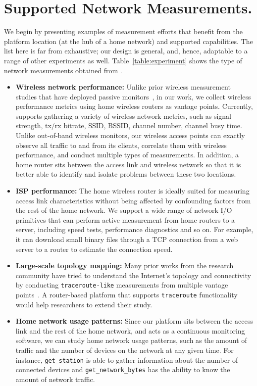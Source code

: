 {\section{Supported Network Measurements.}
\label{sec.network_measurement}
We begin by presenting examples of measurement efforts that benefit from the platform location (at the hub of a home network) and supported capabilities. The list here is far from exhaustive; our design is general, and, hence, adaptable to a range of other experiments as well. Table~\ref{table:experiment} shows the type of network measurements obtained from \sysname.

\begin{itemize}
\item \textbf{Wireless network performance:} Unlike prior wireless measurement studies that have deployed passive monitors~\cite{mahajan2006analyzing,raghavendra2009wi,papagiannaki2006experimental}, in our work, we collect wireless performance metrics using home wireless routers as vantage points. Currently, \sysname supports gathering a variety of wireless network metrics, such as signal strength, tx/rx bitrate, SSID, BSSID, channel number, channel busy time. Unlike out-of-band wireless monitors, our wireless access points can exactly observe all traffic to and from its clients, correlate them with wireless performance, and conduct multiple types of measurements. In addition, a home router sits between the access link and wireless network so that it is better able to identify and isolate problems between these two locations.

\item \textbf{ISP performance:} The home wireless router is ideally suited for measuring access link characteristics without being affected by confounding factors from the rest of the home network. We support a wide range of network I/O primitives that can perform active measurement from home routers to a server, including speed tests, performance diagnostics and so on. For example, it can download small binary files through a TCP connection from a web server to a router to estimate the connection speed.

\item \textbf{Large-scale topology mapping:} Many prior works from the research community have tried to understand the Internet's topology and connectivity by conducting \texttt{traceroute-like} measurements from multiple vantage points~\cite{paxson1996end,chen2009sidewalk}. A router-based platform that supports \texttt{traceroute} functionality would help researchers to extend their study.

\item \textbf{Home network usage patterns:} Since our platform sits between the access link and the rest of the home network, and acts as a continuous monitoring software, we can study home network usage patterns, such as the amount of traffic and the number of devices on the network at any given time. For instance, \texttt{get\_station} is able to gather information about the number of connected devices and \texttt{get\_network\_bytes} has the ability to know the amount of network traffic.    
\end{itemize} 
\par}
